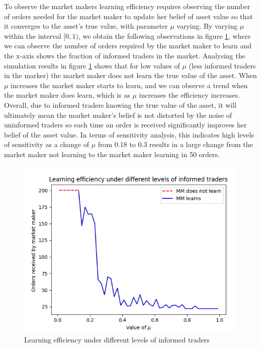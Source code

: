 \documentclass{article}
\begin{document}
To observe the market makers learning efficiency requires observing the number of orders needed for the market maker to update her belief of asset value so that it converges to the asset's true value, with parameter $\mu$ varying. By varying $\mu$ within the interval $[0,1)$, we obtain the following observations in figure \ref{fig:mu}, where we can observe the number of orders required by the market maker to learn and the x-axis shows the fraction of informed traders in the market. 
Analysing the simulation results in figure \ref{fig:mu} shows that for low values of $\mu$ (less informed traders in the marker) the market maker does not learn the true value of the asset. When $\mu$ increases the market maker starts to learn, and we can observe a trend when the market maker does learn, which is as $\mu$ increases the efficiency increases. Overall, due to informed traders knowing the true value of the asset, it will ultimately mean the market maker's belief is not distorted by the noise of uninformed traders so each time an order is received significantly improves her belief of the asset value. In terms of sensitivity analysis, this indicates high levels of sensitivity as a change of $\mu$ from 0.18 to 0.3 results in a large change from the market maker not learning to the market maker learning in 50 orders.

\begin{figure}[h]
    \centering
    \includegraphics[scale=0.6]{mu.png}
    \caption{Learning efficiency under different levels of informed traders}
    \label{fig:mu}
\end{figure}
\end{document}
